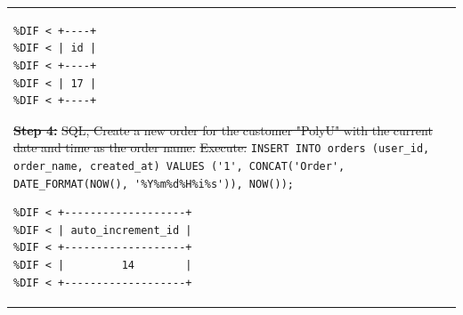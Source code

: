 \documentclass[preprint,12pt]{elsarticle}
\providecommand{\DIFdeltex}[1]{{\protect\color{red}\sout{#1}}}                      %
\providecommand{\DIFmodbegin}{} %
\providecommand{\DIFmodend}{} %
\providecommand{\DIFdel}[1]{\texorpdfstring{\DIFdeltex{#1}}{}} %
\begin{document}
\begin{center}
\begin{longtable}{p{390pt}}
{}%
\DIFmodbegin
\begin{lstlisting}[alsolanguage=DIFcode]
%DIF < Results from executing the SQL:
%DIF < +----+
%DIF < | id |
%DIF < +----+
%DIF < | 17 |
%DIF < +----+
\end{lstlisting}
\DIFmodend %
\textbf{\DIFdel{Step 4:}} %
\DIFdel{SQL, Create a new order for the customer "PolyU" with the current date and time as the order name.}%
\DIFdel{Execute:}%
%
{\color{red}%
\lstinline!INSERT INTO orders (user_id, order_name, created_at) VALUES ('1', CONCAT('Order', DATE_FORMAT(NOW(), '%Y%m%d%H%i%s')), NOW());! %
}%
\DIFmodbegin
\begin{lstlisting}[alsolanguage=DIFcode]
%DIF < Results from executing the SQL:
%DIF < +-------------------+
%DIF < | auto_increment_id |
%DIF < +-------------------+
%DIF < |         14        |
%DIF < +-------------------+
\end{lstlisting}
\DIFmodend %

\end{longtable}
\end{center}
\end{document}
